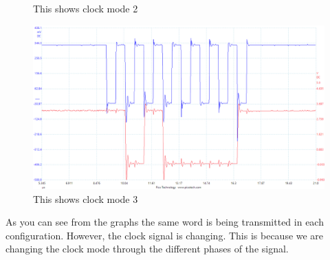 \documentclass[a4paper,12pt]{scrartcl}
\begin{document}
{{{\begin{figure}[h]
					\caption{This shows clock mode 2}
					\label{img:ClockMode2}
				\end{figure}
				\begin{figure}[h]
					\centering
					\includegraphics[width=\textwidth]{Ex1/mode3}
					\caption{This shows clock mode 3}
					\label{img:ClockMode3}
				\end{figure}
				As you can see from the graphs the same word is being transmitted in each configuration. However, the clock signal is changing. This is because we are changing the clock mode through the different phases of the signal.
			}
		
}}
\end{document}
